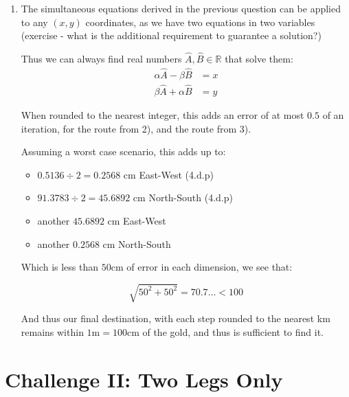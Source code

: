 \documentclass{article}
\begin{document}
\begin{enumerate}
\item The simultaneous equations derived in the previous question can be applied to any $(x,y)$ coordinates, as we have two equations in two variables (exercise - what is the additional requirement to guarantee a solution?)

Thus we can always find real numbers $\hat{A},\hat{B}\in \mathbb{R}$ that solve them: 
\begin{align}
    \alpha \hat{A} - \beta \hat{B} &= x \\
    \beta \hat{A} + \alpha \hat{B} &= y
\end{align}


When rounded to the nearest integer, this adds an error of at most $0.5$ of an iteration, for the route from 2), and the route from 3).

Assuming a worst case scenario, this adds up to:

\begin{itemize}
\item $0.5136 \div 2 = 0.2568$ cm East-West (4.d.p)
\item $91.3783 \div 2 = 45.6892$ cm North-South (4.d.p)
\item another $45.6892$ cm East-West 
\item another $0.2568$ cm North-South
\end{itemize}

Which is less than $50$cm of error in each dimension, we see that:

$$
\sqrt{50^2 + 50^2} = 70.7\dots < 100
$$

And thus our final destination, with each step rounded to the nearest km remains within $1\text{m} = 100 \text{cm}$ of the gold, and thus is sufficient to find it.

\end{enumerate}

\section{Challenge II: Two Legs Only}
\end{document}
